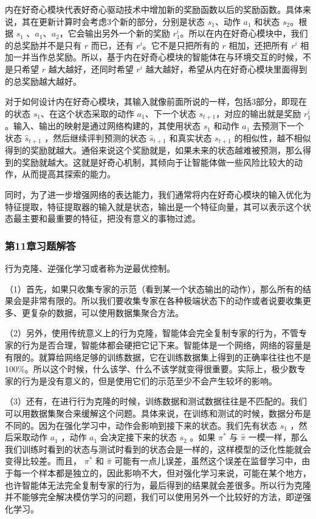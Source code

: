 
内在好奇心模块代表好奇心驱动技术中增加新的奖励函数以后的奖励函数。具体来说，其在更新计算时会考虑3个新的部分，分别是状态 $s_1$、动作 $a_1$ 和状态 $s_2$。根据 $s_1$ 、$a_1$、$a_2$，它会输出另外一个新的奖励 $r_1^i$。所以在内在好奇心模块中，我们的总奖励并不是只有 $r$ 而已，还有 $r^i$。它不是只把所有的 $r$ 相加，还把所有 $r^i$ 相加一并当作总奖励。所以，基于内在好奇心模块的智能体在与环境交互的时候，不是只希望 $r$ 越大越好，还同时希望 $r^i$ 越大越好，希望从内在好奇心模块里面得到的总奖励越大越好。

对于如何设计内在好奇心模块，其输入就像前面所说的一样，包括3部分，即现在的状态 $s_1$、在这个状态采取的动作 $a_1$、下一个状态 $s_{t+1}$，对应的输出就是奖励 $r_1^i$。输入、输出的映射是通过网络构建的，其使用状态 $s_1$ 和动作 $a_1$ 去预测下一个状态 $\hat{s}_{t+1}$ ，然后继续评判预测的状态 $\hat{s}_{t+1}$ 和真实状态 $s_{t+1}$ 的相似性，越不相似得到的奖励就越大。通俗来说这个奖励就是，如果未来的状态越难被预测，那么得到的奖励就越大。这就是好奇心机制，其倾向于让智能体做一些风险比较大的动作，从而提高其探索的能力。

同时，为了进一步增强网络的表达能力，我们通常将内在好奇心模块的输入优化为特征提取，特征提取器的输入就是状态，输出是一个特征向量，其可以表示这个状态最主要和最重要的特征，把没有意义的事物过滤。



\subsubsection*{第11章习题解答}


行为克隆、逆强化学习或者称为逆最优控制。


（1）首先，如果只收集专家的示范（看到某一个状态输出的动作），那么所有的结果会是非常有限的。所以我们要收集专家在各种极端状态下的动作或者说要收集更多、更复杂的数据，可以使用数据集聚合方法。

（2）另外，使用传统意义上的行为克隆，智能体会完全复制专家的行为，不管专家的行为是否合理，智能体都会硬把它记下来。智能体是一个网络，网络的容量是有限的。就算给网络足够的训练数据，它在训练数据集上得到的正确率往往也不是100\%。所以这个时候，什么该学、什么不该学就变得很重要。实际上，极少数专家的行为是没有意义的，但是使用它们的示范至少不会产生较坏的影响。

（3）还有，在进行行为克隆的时候，训练数据和测试数据往往是不匹配的。我们可以用数据集聚合来缓解这个问题。具体来说，在训练和测试的时候，数据分布是不同的。因为在强化学习中，动作会影响到接下来的状态。我们先有状态 $s_1$ ，然后采取动作 $a_1$ ，动作 $a_1$ 会决定接下来的状态 $s_2$ 。如果 $\pi^*$ 与 $\hat{\pi}$ 一模一样，那么我们训练时看到的状态与测试时看到的状态会是一样的，这样模型的泛化性能就会变得比较差。而且， $\pi^*$ 和 $\hat{\pi}$ 可能有一点儿误差，虽然这个误差在监督学习中，由于每一个样本都是独立的，因此影响不大，但对强化学习来说，可能在某个地方，也许智能体无法完全复制专家的行为，最后得到的结果就会差很多。所以行为克隆并不能够完全解决模仿学习的问题，我们可以使用另外一个比较好的方法，即逆强化学习。

